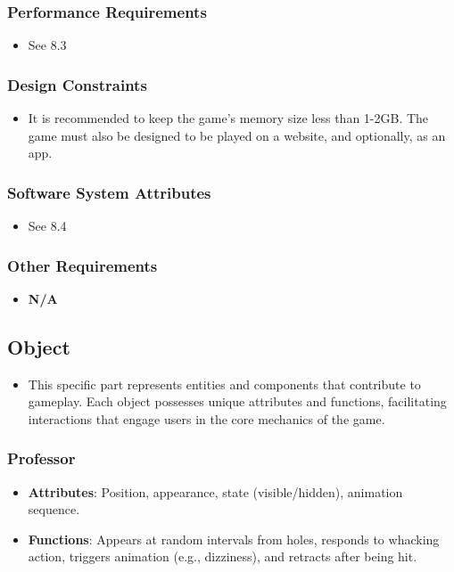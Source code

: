 \documentclass{article}
\begin{document}
\subsubsection{Performance Requirements}
\begin{itemize}
    \item See 8.3
\end{itemize}
\subsubsection{Design Constraints}
\begin{itemize}
    \item It is recommended to keep the game’s memory size less than 1-2GB. The game must also be designed to be played on a website, and optionally, as an app.
\end{itemize}
\subsubsection{Software System Attributes}
\begin{itemize}
    \item See 8.4
\end{itemize}
\subsubsection{Other Requirements}
\begin{itemize}
    \item \textbf{N/A}
\end{itemize}

\subsection{Object}
\begin{itemize}
    \item This specific part represents entities and components that contribute to gameplay. Each object possesses unique attributes and functions, facilitating interactions that engage users in the core mechanics of the game.
\end{itemize}
\subsubsection{Professor}
\begin{itemize}
    \item \textbf{Attributes}: Position, appearance, state (visible/hidden), animation sequence.
    \item \textbf{Functions}: Appears at random intervals from holes, responds to whacking action, triggers animation (e.g., dizziness), and retracts after being hit.
\end{itemize}
\end{document}
